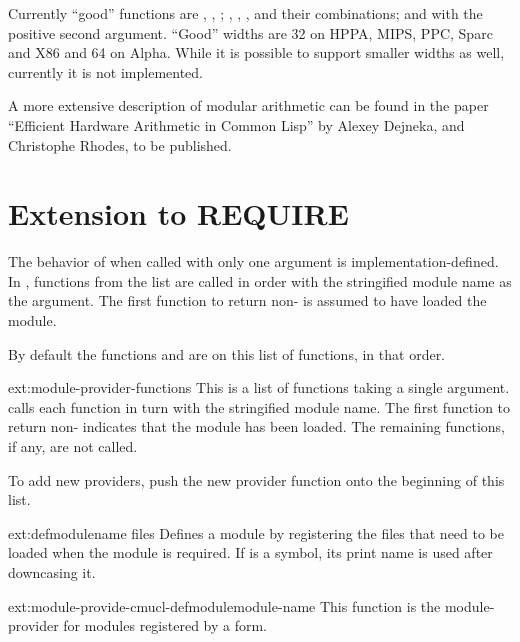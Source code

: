 Currently ``good'' functions
are \code{+}, \code{-}, \code{*}; , ,
,  and their combinations;
and  with the positive second argument. ``Good'' widths
are 32 on HPPA, MIPS, PPC, Sparc and X86 and 64 on Alpha. While it is
possible to support smaller widths as well, currently it is not
implemented.

A more extensive description of modular arithmetic can be found in the
paper ``Efficient Hardware Arithmetic in Common Lisp'' by Alexey
Dejneka, and Christophe Rhodes, to be published.

\section{Extension to REQUIRE}

The behavior of  when called with only one argument is
implementation-defined.  In \cmucl, functions from the list
 are called in order with the
stringified module name as the argument.  The first function to return
non- is assumed to have loaded the module.

By default the functions  and
 are on this list of functions, in
that order.

\begin{defvar}{ext:}{module-provider-functions}
  This is a list of functions taking a single argument.
   calls each function in turn with the stringified
  module name.  The first function to return non- indicates
  that the module has been loaded.  The remaining functions, if any,
  are not called.

  To add new providers, push the new provider function onto the
  beginning of this list.
\end{defvar}

\begin{defmac}{ext:}{defmodule}{name \amprest{} files}
  Defines a module by registering the files that need to be loaded
  when the module is required.  If  is a symbol, its print
  name is used after downcasing it.
\end{defmac}

\begin{defun}{ext:}{module-provide-cmucl-defmodule}{module-name}
  This function is the module-provider for modules registered by a
   form.  
\end{defun}

